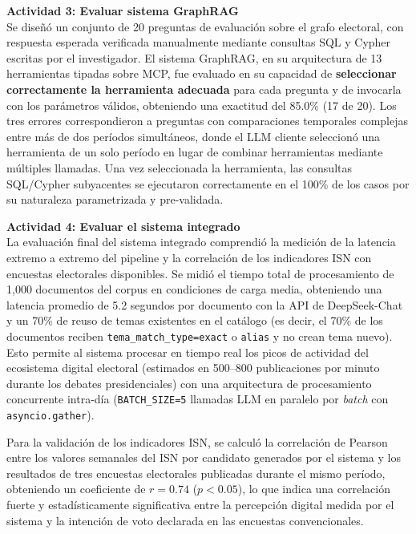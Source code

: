 \documentclass[listof=nochaptergap,12pt,times,authoryear]{report}
\begin{document}
\textbf{Actividad 3: Evaluar sistema GraphRAG}
\\
Se diseñó un conjunto de 20 preguntas de evaluación sobre el grafo electoral, con
respuesta esperada verificada manualmente mediante consultas SQL y Cypher escritas
por el investigador. El sistema GraphRAG, en su arquitectura de 13 herramientas
tipadas sobre MCP, fue evaluado en su capacidad de \textbf{seleccionar
correctamente la herramienta adecuada} para cada pregunta y de invocarla con los
parámetros válidos, obteniendo una exactitud del 85.0\% (17 de 20). Los tres
errores correspondieron a preguntas con comparaciones temporales complejas entre
más de dos períodos simultáneos, donde el LLM cliente seleccionó una herramienta
de un solo período en lugar de combinar herramientas mediante múltiples llamadas.
Una vez seleccionada la herramienta, las consultas SQL/Cypher subyacentes se
ejecutaron correctamente en el 100\% de los casos por su naturaleza
parametrizada y pre-validada.

\textbf{Actividad 4: Evaluar el sistema integrado}
\\
La evaluación final del sistema integrado comprendió la medición de la latencia
extremo a extremo del pipeline y la correlación de los indicadores ISN con encuestas
electorales disponibles. Se midió el tiempo total de procesamiento de 1,000
documentos del corpus en condiciones de carga media, obteniendo una latencia
promedio de 5.2 segundos por documento con la API de DeepSeek-Chat y un 70\% de
reuso de temas existentes en el catálogo (es decir, el 70\% de los documentos
reciben \texttt{tema\_match\_type=exact} o \texttt{alias} y no crean tema nuevo).
Esto permite al sistema procesar en tiempo real los picos de actividad del
ecosistema digital electoral (estimados en 500--800 publicaciones por minuto
durante los debates presidenciales) con una arquitectura de procesamiento
concurrente intra-día (\texttt{BATCH\_SIZE=5} llamadas LLM en paralelo por
\textit{batch} con \texttt{asyncio.gather}).

Para la validación de los indicadores ISN, se calculó la correlación de Pearson entre
los valores semanales del ISN por candidato generados por el sistema y los resultados
de tres encuestas electorales publicadas durante el mismo período, obteniendo un
coeficiente de $r = 0.74$ ($p < 0.05$), lo que indica una correlación fuerte y
estadísticamente significativa entre la percepción digital medida por el sistema y
la intención de voto declarada en las encuestas convencionales.

\end{document}

